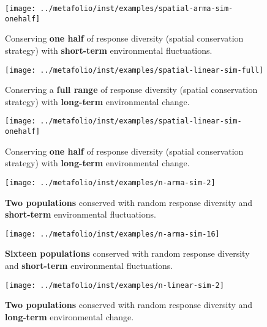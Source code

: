 \begin{figure}[htbp]
\centering
\texttt{[image: ../metafolio/inst/examples/spatial-arma-sim-onehalf]}
\caption{Conserving \textbf{one half} of response diversity (spatial
conservation strategy) with \textbf{short-term} environmental fluctuations.}
\label{f:eg-sp-arma-half}
\end{figure}

\clearpage

\begin{figure}[htbp]
\centering
\texttt{[image: ../metafolio/inst/examples/spatial-linear-sim-full]}
\caption{Conserving a \textbf{full range} of response diversity (spatial
conservation strategy) with \textbf{long-term} environmental change.}
\label{f:eg-sp-linear-full}
\end{figure}

\clearpage

\begin{figure}[htbp]
\centering
\texttt{[image: ../metafolio/inst/examples/spatial-linear-sim-onehalf]}
\caption{Conserving \textbf{one half} of response diversity (spatial
conservation strategy) with \textbf{long-term} environmental change.}
\label{f:eg-sp-linear-half}
\end{figure}

\clearpage

\begin{figure}[htbp]
\centering
\texttt{[image: ../metafolio/inst/examples/n-arma-sim-2]}
\caption{\textbf{Two populations} conserved with random response diversity and
\textbf{short-term} environmental fluctuations.}
\label{f:eg-n-arma-two}
\end{figure}

\clearpage

\begin{figure}[htbp]
\centering
\texttt{[image: ../metafolio/inst/examples/n-arma-sim-16]}
\caption{\textbf{Sixteen populations} conserved with random response diversity
and \textbf{short-term} environmental fluctuations.}
\label{f:eg-n-arma-sixteen}
\end{figure}

\clearpage

\begin{figure}[htbp]
\centering
\texttt{[image: ../metafolio/inst/examples/n-linear-sim-2]}
\caption{\textbf{Two populations} conserved with random response diversity and
\textbf{long-term} environmental change.}
\label{f:eg-n-linear-two}
\end{figure}

